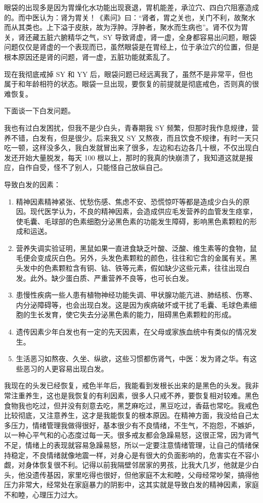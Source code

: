 \documentclass[fontset=founder]{ctexart}
\begin{document}
眼袋的出现多是因为胃燥化水功能出现衰退，胃机能差，承泣穴、四白穴阻塞造成的。而中医认为：肾为胃关！《素问》曰：“肾者，胃之关也，关门不利，故聚水而从其类也。上下溢于皮肤，故为浮肿。浮肿者，聚水而生病也”。肾不仅为胃关，肾还藏五脏六腑精华之气，SY 导致肾虚，肾一虚，全身都容易出问题，眼袋问题仅仅是肾虚的一个表现而已，虽然眼袋是在胃经上，位于承泣穴的位置，但是根本原因还是肾的问题，肾一虚，五脏功能就紊乱了。

现在我彻底戒掉 SY 和 YY 后，眼袋问题已经远离我了，虽然不是非常平，但也属于和年龄相符的状态。眼袋一旦出现，要恢复的前提就是彻底戒色，否则真的很难恢复。

下面谈一下白发问题。

我也有过白发困扰，但我不是少白头，青春期我 SY 频繁，但那时我作息规律，营养不错，白发有，但是很少。后来我又 SY 又熬夜，而且饮食不规律，有时一天只吃一顿，这样没多久，我白发就冒出来了很多，左边和右边各几十根，不仅出现白发还开始大量脱发，每天 100 根以上，那时的我真的快崩溃了，我知道这就是报应，自作自受，怪不了别人，只能怪自己放纵自己。

导致白发的因素：

\begin{enumerate}
    \item 精神因素精神紧张、忧愁伤感、焦虑不安、恐慌惊吓等都是造成少白头的原因。现代医学认为，不良的精神因素，会造成供应毛发营养的血管发生痉挛，使毛囊、毛球部的色素细胞分泌黑色素的功能发生障碍，影响黑色素颗粒的形成和运送。
    \item 营养失调实验证明，黑鼠如果一直进食缺乏叶酸、泛酸、维生素等的食物，鼠毛便会变成灰白色。另外，头发色素颗粒的颜色，往往和它含的金属有关。黑头发中的色素颗粒含有铜、钴、铁等元素，假如缺少这些元素，往往出现白发。此外。缺少蛋白质、严重营养不良等，也可长白发。
    \item 患慢性疾病一些人患有植物神经功能失调、甲状腺功能亢进、肺结核、伤寒、内分泌障碍等，也会出现白发。这是因为疾病破坏或干扰了毛囊、毛球色素细胞的生长发育，使它失去分泌黑色素的能力，阻碍黑色素颗粒的形成。
    \item 遗传因素少年白发也有一定的先天因素，在父母或家族血统中有类似的情况发生。
    \item 生活恶习如熬夜、久坐、纵欲，这些习惯都伤肾气，中医：发为肾之华。有这些恶习的人更容易出现白发。
\end{enumerate}

我现在的头发已经恢复，戒色半年后，我能看到发根长出来的是黑色的头发。我非常注重养生，这也是我恢复的有利因素，很多人只戒不养，要恢复相对较难。黑色食物我也吃过，但并没有刻意去吃，黑芝麻吃过，黑豆吃过，香菇也常吃。我戒色比较彻底，又注意养生，这才是我能恢复的根本原因。在精神方面，我没给自己太多压力，情绪管理我做得很好，基本很少有不良情绪，不生气，不抱怨，不嫉妒，以一种心平气和的心态度过每一天。很多戒友都会急躁易怒，这很正常，因为肾气不足，情绪上的表现就容易急躁易怒，所以一定要注意情绪管理，让自己的情绪保持稳定，不良情绪就像地震一样，对身心是有很大的负面影响的，危害实在不容小觑，对身体恢复很不利。记得以前我隔壁邻居家的男孩，比我大几岁，他就是少白头，他没遗传基因，家里吃得也很好，但他家庭不太和睦，父母经常吵架，搞得他压力非常大，经常处在家庭暴力的阴影中，这其实就是导致白发的精神因素，家庭不和睦，心理压力过大。
\end{document}
